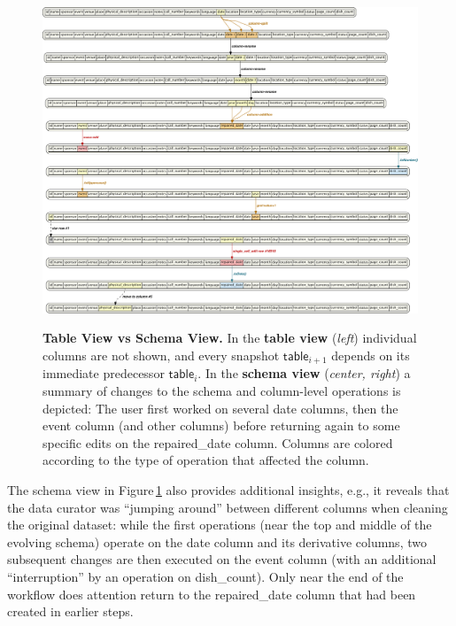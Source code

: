 \documentclass[conference]{ijdc-v14}
\newcommand{\Figref}[1]{Figure\,\ref{#1}}
\newcommand{\co}[1]{\textsf{\small{#1}}}
\begin{document}
\begin{figure}[t]
{\includegraphics[height=0.4\textheight]{idcc2021/figures/schema_view-crop.pdf}} 
\caption{\textbf{Table View vs Schema View.} In the \textbf{table view} (\emph{left}) individual
  columns are not shown, and every snapshot $\mathsf{table}_{i+1}$ depends on its immediate
  predecessor $\mathsf{table}_i$. In the \textbf{schema view} (\emph{center, right}) a summary of
  changes to the schema and column-level operations is depicted: The user first worked on several
  \textsf{date} columns, then the \textsf{event} column (and other columns) before returning again
  to some specific edits on the \textsf{repaired\_date} column. Columns are colored according to the
  type of operation that affected the column.}
    \label{fig:linear_view}
\end{figure}


 
 
 
The schema view in \Figref{fig:linear_view} also provides additional insights, e.g., it reveals that
the data curator was ``jumping around'' between different columns when cleaning the original
dataset: while the first operations (near the top and middle of the evolving schema) operate on the
\co{date} column and its derivative columns, two subsequent changes are then executed on the
\co{event} column (with an additional ``interruption'' by an operation on \co{dish\_count}). Only
near the end of the workflow does attention return to the \co{repaired\_date} column that had been
created in earlier steps.
\end{document}
